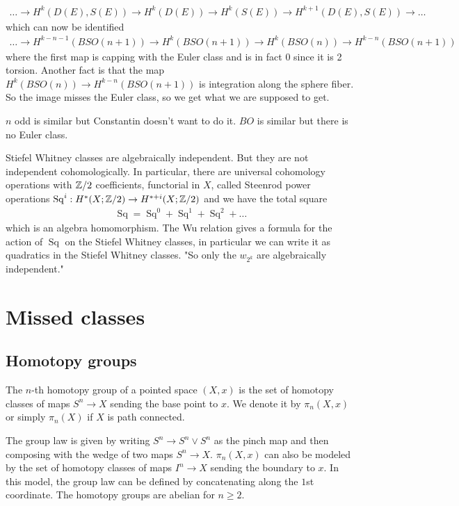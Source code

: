 \documentclass[12pt]{article}
\DeclareMathOperator{\Sq}{Sq}
\begin{document}
\begin{align*}
    \dots \to H^k(D(E), S(E)) \to H^k(D(E)) \to H^k(S(E)) \to H^{k+1}(D(E), S(E)) \to \dots
\end{align*} which can now be identified \begin{align*}
    \dots \to H^{k-n-1}(BSO(n+1)) \to H^k(BSO(n+1)) \to H^k(BSO(n)) \to H^{k-n}(BSO(n+1)) 
\end{align*} where the first map is capping with the Euler class and is in fact $0$ since it is 2 torsion. Another fact is that the map $H^k(BSO(n)) \to H^{k-n}(BSO(n+1))$ is integration along the sphere fiber. So the image misses the Euler class, so we get what we are supposed to get.

$n$ odd is similar but Constantin doesn't want to do it. $BO$ is similar but there is no Euler class.

\begin{remark}
    Stiefel Whitney classes are algebraically independent. But they are not independent cohomologically. In particular, there are universal cohomology operations with $\mathbb{Z}/2$ coefficients, functorial in $X$, called Steenrod power operations $\Sq^i: H^*(X;\Z/2) \to H^{*+i}(X;\Z/2)$ and we have the total square \begin{align*}
    \Sq = \Sq^0 + \Sq^1 + \Sq^2 + \dots
\end{align*} which is an algebra homomorphism. The Wu relation gives a formula for the action of $\Sq$ on the Stiefel Whitney classes, in particular we can write it as quadratics in the Stiefel Whitney classes. "So only the $w_{2^k}$ are algebraically independent."
\end{remark}

\section{Missed classes}
\subsection{Homotopy groups}
\begin{definition}
    The $n$-th homotopy group of a pointed space $(X,x)$ is the set of homotopy classes of maps $S^n \to X$ sending the base point to $x$. We denote it by $\pi_n(X,x)$ or simply $\pi_n(X)$ if $X$ is path connected.
\end{definition}
The group law is given by writing $S^n \to S^n \vee S^n$ as the pinch map and then composing with the wedge of two maps $S^n \to X$. $\pi_n(X,x)$ can also be modeled by the set of homotopy classes of maps $I^n \to X$ sending the boundary to $x$. In this model, the group law can be defined by concatenating along the $1$st coordinate. 
The homotopy groups are abelian for $n\geq 2$.
\end{document}
